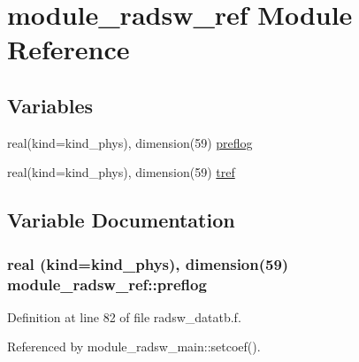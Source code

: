 \hypertarget{namespacemodule__radsw__ref}{}\section{module\+\_\+radsw\+\_\+ref Module Reference}
\label{namespacemodule__radsw__ref}
\subsection*{Variables}
\begin{DoxyCompactItemize}
\item 
real(kind=kind\+\_\+phys), dimension(59) \hyperlink{namespacemodule__radsw__ref_afb71559d084ca709bd134e6c489035e2}{preflog}
\item 
real(kind=kind\+\_\+phys), dimension(59) \hyperlink{group__module__radsw__main_ga449fffa7047caa0fba6c166c26f7dbbd}{tref}
\end{DoxyCompactItemize}


\subsection{Variable Documentation}
\subsubsection[{\texorpdfstring{preflog}{preflog}}]{\setlength{\rightskip}{0pt plus 5cm}real (kind=kind\+\_\+phys), dimension(59) module\+\_\+radsw\+\_\+ref\+::preflog}\hypertarget{namespacemodule__radsw__ref_afb71559d084ca709bd134e6c489035e2}{}\label{namespacemodule__radsw__ref_afb71559d084ca709bd134e6c489035e2}


Definition at line 82 of file radsw\+\_\+datatb.\+f.



Referenced by module\+\_\+radsw\+\_\+main\+::setcoef().

